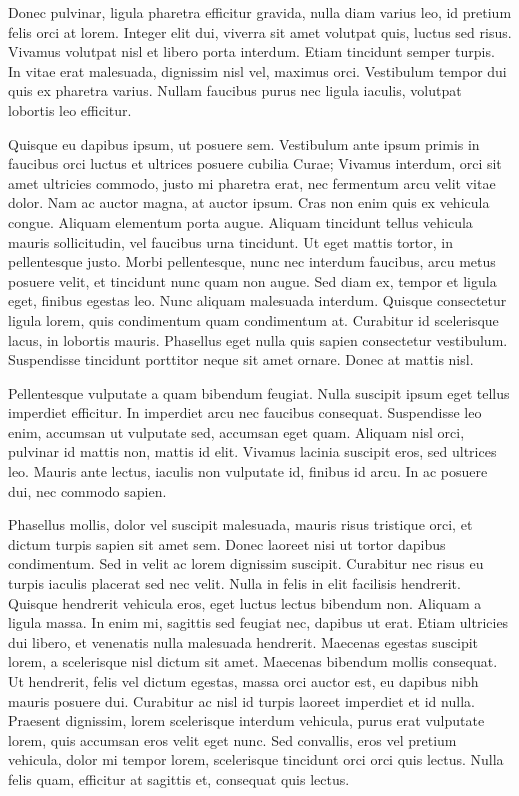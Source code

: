 Donec pulvinar, ligula pharetra efficitur gravida, nulla diam varius leo, id pretium felis orci at lorem. Integer elit dui, viverra sit amet volutpat quis, luctus sed risus. Vivamus volutpat nisl et libero porta interdum. Etiam tincidunt semper turpis. In vitae erat malesuada, dignissim nisl vel, maximus orci. Vestibulum tempor dui quis ex pharetra varius. Nullam faucibus purus nec ligula iaculis, volutpat lobortis leo efficitur.

Quisque eu dapibus ipsum, ut posuere sem. Vestibulum ante ipsum primis in faucibus orci luctus et ultrices posuere cubilia Curae; Vivamus interdum, orci sit amet ultricies commodo, justo mi pharetra erat, nec fermentum arcu velit vitae dolor. Nam ac auctor magna, at auctor ipsum. Cras non enim quis ex vehicula congue. Aliquam elementum porta augue. Aliquam tincidunt tellus vehicula mauris sollicitudin, vel faucibus urna tincidunt. Ut eget mattis tortor, in pellentesque justo. Morbi pellentesque, nunc nec interdum faucibus, arcu metus posuere velit, et tincidunt nunc quam non augue. Sed diam ex, tempor et ligula eget, finibus egestas leo. Nunc aliquam malesuada interdum. Quisque consectetur ligula lorem, quis condimentum quam condimentum at. Curabitur id scelerisque lacus, in lobortis mauris. Phasellus eget nulla quis sapien consectetur vestibulum. Suspendisse tincidunt porttitor neque sit amet ornare. Donec at mattis nisl.

Pellentesque vulputate a quam bibendum feugiat. Nulla suscipit ipsum eget tellus imperdiet efficitur. In imperdiet arcu nec faucibus consequat. Suspendisse leo enim, accumsan ut vulputate sed, accumsan eget quam. Aliquam nisl orci, pulvinar id mattis non, mattis id elit. Vivamus lacinia suscipit eros, sed ultrices leo. Mauris ante lectus, iaculis non vulputate id, finibus id arcu. In ac posuere dui, nec commodo sapien.

Phasellus mollis, dolor vel suscipit malesuada, mauris risus tristique orci, et dictum turpis sapien sit amet sem. Donec laoreet nisi ut tortor dapibus condimentum. Sed in velit ac lorem dignissim suscipit. Curabitur nec risus eu turpis iaculis placerat sed nec velit. Nulla in felis in elit facilisis hendrerit. Quisque hendrerit vehicula eros, eget luctus lectus bibendum non. Aliquam a ligula massa. In enim mi, sagittis sed feugiat nec, dapibus ut erat. Etiam ultricies dui libero, et venenatis nulla malesuada hendrerit. Maecenas egestas suscipit lorem, a scelerisque nisl dictum sit amet. Maecenas bibendum mollis consequat. Ut hendrerit, felis vel dictum egestas, massa orci auctor est, eu dapibus nibh mauris posuere dui. Curabitur ac nisl id turpis laoreet imperdiet et id nulla. Praesent dignissim, lorem scelerisque interdum vehicula, purus erat vulputate lorem, quis accumsan eros velit eget nunc. Sed convallis, eros vel pretium vehicula, dolor mi tempor lorem, scelerisque tincidunt orci orci quis lectus. Nulla felis quam, efficitur at sagittis et, consequat quis lectus.

